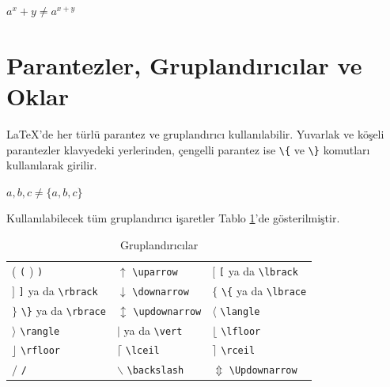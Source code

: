 \documentclass[
  10pt,
]{scrbook}
\newenvironment{Shaded}{}{}
\newcommand{\SpecialCharTok}[1]{\textcolor[rgb]{0.25,0.44,0.63}{#1}}
\newcommand{\SpecialStringTok}[1]{\textcolor[rgb]{0.73,0.40,0.53}{#1}}
\theoremstyle{definition}
\theoremstyle{definition}
\theoremstyle{definition}
\theoremstyle{definition}
\theoremstyle{remark}
\begin{document}
\begin{Shaded}
\end{Shaded}

\(a^x+y \neq a^{x+y}\)

\hypertarget{parantezler-gruplandux131rux131cux131lar-ve-oklar}{%
\section{Parantezler, Gruplandırıcılar ve Oklar}\label{parantezler-gruplandux131rux131cux131lar-ve-oklar}}

LaTeX'de her türlü parantez ve gruplandırıcı kullanılabilir. Yuvarlak ve köşeli parantezler klavyedeki yerlerinden, çengelli parantez ise \texttt{\textbackslash{}\{} ve \texttt{\textbackslash{}\}} komutları kullanılarak girilir.

\begin{Shaded}
\end{Shaded}

\({a,b,c}\neq\{a,b,c\}\)

Kullanılabilecek tüm gruplandırıcı işaretler Tablo \ref{tab:grup}'de gösterilmiştir.

\begin{longtable}[]{@{}
  >{\raggedright\arraybackslash}p{}
  >{\raggedright\arraybackslash}p{}
  >{\raggedright\arraybackslash}p{}@{}}
\caption{\label{tab:grup} Gruplandırıcılar}\tabularnewline
\toprule
\endhead
( \texttt{(} ) \texttt{)} & \(\uparrow\) \texttt{\textbackslash{}uparrow} & \([\) \texttt{{[}} ya da \texttt{\textbackslash{}lbrack} \\
\(]\) \texttt{{]}} ya da \texttt{\textbackslash{}rbrack} & \(\downarrow\) \texttt{\textbackslash{}downarrow} & \(\lbrace\) \texttt{\textbackslash{}\{} ya da \texttt{\textbackslash{}lbrace} \\
\(\rbrace\) \texttt{\textbackslash{}\}} ya da \texttt{\textbackslash{}rbrace} & \(\updownarrow\) \texttt{\textbackslash{}updownarrow} & \(\langle\) \texttt{\textbackslash{}langle} \\
\(\rangle\) \texttt{\textbackslash{}rangle} & \(\vert\) \texttt{\textbar{}} ya da \texttt{\textbackslash{}vert} & \(\lfloor\) \texttt{\textbackslash{}lfloor} \\
\(\rfloor\) \texttt{\textbackslash{}rfloor} & \(\lceil\) \texttt{\textbackslash{}lceil} & \(\rceil\) \texttt{\textbackslash{}rceil} \\
\(/\) \texttt{/} & \(\backslash\) \texttt{\textbackslash{}backslash} & \(\Updownarrow\) \texttt{\textbackslash{}Updownarrow} \\
\bottomrule
\end{longtable}
\end{document}
